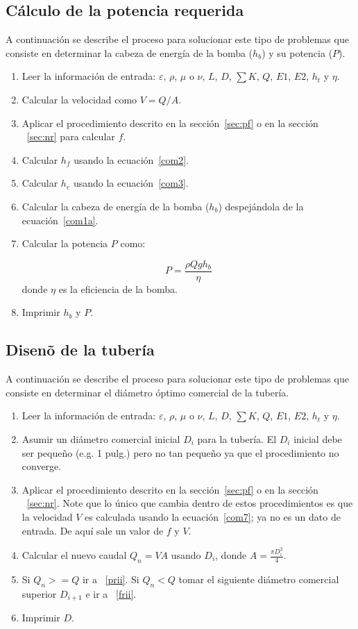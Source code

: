 \documentclass[11pt, oneside]{article}
\begin{document}
\subsection{C\'alculo de la potencia requerida}\label{tubeSimplePoten}
A continuaci\'on se describe el proceso para solucionar este tipo de problemas que consiste en determinar la cabeza de energ\'ia de la bomba ($h_b$) y su potencia  ($P$).
\begin{enumerate} 
\item Leer la informaci\'on de entrada: $\varepsilon$, $\rho$, $\mu$ o $\nu$, $L$, $D$, $\sum K$, $Q$, $E1$, $E2$, $h_t$ y $\eta$.
\item Calcular la velocidad como $V=Q/A$.
\item Aplicar el procedimiento descrito en la secci\'on~\ref{sec:pf} o en la secci\'on ~\ref{sec:nr} para calcular $f$.
\item Calcular $h_f$ usando la ecuaci\'on~\ref{com2}.
\item Calcular $h_e$ usando la ecuaci\'on~\ref{com3}.
\item Calcular la cabeza de energ\'ia de la bomba ($h_b$) despej\'andola de la ecuaci\'on~\ref{com1a}.
\item Calcular la potencia $P$ como:

\begin{equation}
P = \frac{\rho Q g h_b}{\eta}
\label{com12a}
\end{equation}
donde $\eta$ es la eficiencia de la bomba.

\item Imprimir $h_b$ y $P$.
\end{enumerate} 

\subsection{Disen\~o de la  tuber\'ia}\label{tubeSimpleDesign}
A continuaci\'on se describe el proceso para solucionar este tipo de problemas que consiste en determinar el di\'ametro \'optimo comercial de la tuber\'ia.
\begin{enumerate} 
\item Leer la informaci\'on de entrada: $\varepsilon$, $\rho$, $\mu$ o $\nu$, $L$, $D$, $\sum K$, $Q$, $E1$, $E2$, $h_t$ y $\eta$.
\item Asumir un di\'ametro comercial inicial $D_i$ para la tuber\'ia. El $D_i$ inicial debe ser peque\~no (e.g. 1 pulg.) pero no tan peque\~no ya que el procedimiento no converge.
\item \label{frii} Aplicar el procedimiento descrito en la secci\'on~\ref{sec:pf} o en la secci\'on ~\ref{sec:nr}. Note que lo \'unico que cambia dentro de estos procedimientos es que la velocidad $V$ es calculada usando la ecuaci\'on~\ref{com7}; ya no es un dato de entrada. De aqu\'i sale un valor de $f$ y $V$.
\item Calcular el nuevo caudal $Q_n =VA$ usando $D_i$, donde $A=\frac{\pi D_i^2}{4}$.
\item Si $Q_n >= Q $ ir a ~\ref{prii}. Si $Q_n < Q$ tomar el siguiente di\'ametro comercial superior $D_{i+1}$ e ir a ~\ref{frii}.
\item \label{prii} Imprimir $D$.
\end{enumerate} 
\end{document}
